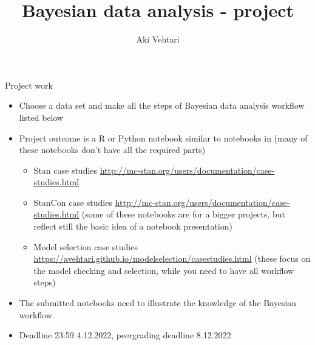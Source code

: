 \documentclass[t]{beamer}
\title[]{Bayesian data analysis - project}
\subtitle{}
\author{Aki Vehtari}
\institute[Aalto]{}
\begin{document}
\begin{frame}

  {\Large\color{navyblue} Project work}
  
  \begin{itemize}
  \item Choose a data set and make all the steps of Bayesian data
    analysis workflow listed below
  \item Project outcome is a R or Python notebook similar to notebooks
    in (many of these notebooks don't have all the required parts)
    \begin{itemize}
    \item Stan case studies \url{http://mc-stan.org/users/documentation/case-studies.html}
    \item StanCon case studies \url{http://mc-stan.org/users/documentation/case-studies.html}
      (some of these notebooks are for a bigger projects, but reflect still the basic idea of a notebook presentation)
    \item Model selection case studies \url{https://avehtari.github.io/modelselection/casestudies.html} (these focus on the model checking and selection, while you need to have all workflow steps)
    \end{itemize}
  \item The submitted notebooks need to illustrate the knowledge of the
    Bayesian workflow.
  \item Deadline 23:59 4.12.2022, peergrading deadline 8.12.2022
  \end{itemize}
\end{frame}
\end{document}
